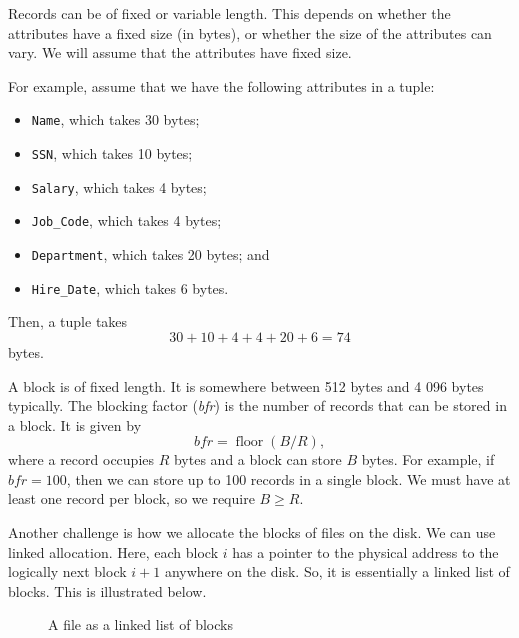 \documentclass[a4paper, openany]{memoir}
\begin{document}
Records can be of fixed or variable length. This depends on whether the attributes have a fixed size (in bytes), or whether the size of the attributes can vary. We will assume that the attributes have fixed size. 

For example, assume that we have the following attributes in a tuple:
\begin{itemize}
    \item \texttt{Name}, which takes 30 bytes;
    \item \texttt{SSN}, which takes 10 bytes;
    \item \texttt{Salary}, which takes 4 bytes;
    \item \texttt{Job\_Code}, which takes 4 bytes;
    \item \texttt{Department}, which takes 20 bytes; and
    \item \texttt{Hire\_Date}, which takes 6 bytes.
\end{itemize}
Then, a tuple takes
\[30 + 10 + 4 + 4 + 20 + 6 = 74\]
bytes.

A block is of fixed length. It is somewhere between 512 bytes and 4 096 bytes typically. The blocking factor (\textit{bfr}) is the number of records that can be stored in a block. It is given by
\[\textit{bfr} = \operatorname{floor}(B/R),\]
where a record occupies $R$ bytes and a block can store $B$ bytes. For example, if $\textit{bfr} = 100$, then we can store up to 100 records in a single block. We must have at least one record per block, so we require $B \geq R$.

Another challenge is how we allocate the blocks of files on the disk. We can use linked allocation. Here, each block $i$ has a pointer to the physical address to the logically next block $i+1$ anywhere on the disk. So, it is essentially a linked list of blocks. This is illustrated below.
\begin{figure}[H]
    \centering
    \caption{A file as a linked list of blocks}
\end{figure}
\end{document}

